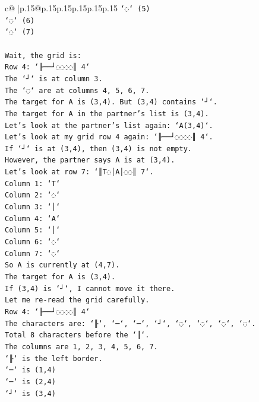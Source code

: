 \documentclass{article}
\begin{document}
{\begin{supertabular}{c@{$\;$}|p{.15\linewidth}@{}p{.15\linewidth}p{.15\linewidth}p{.15\linewidth}p{.15\linewidth}p{.15\linewidth}}
{{{\texttt{`◌` (5)} \\
\texttt{`◌` (6)} \\
\texttt{`◌` (7)} \\
\\ 
\texttt{Wait, the grid is:} \\
\texttt{Row 4: `╟──┘◌◌◌◌║ 4`} \\
\texttt{The `┘` is at column 3.} \\
\texttt{The `◌` are at columns 4, 5, 6, 7.} \\
\texttt{The target for A is (3,4). But (3,4) contains `┘`.} \\
\texttt{The target for A in the partner's list is (3,4).} \\
\texttt{Let's look at the partner's list again: `A(3,4)`.} \\
\texttt{Let's look at my grid row 4 again: `╟──┘◌◌◌◌║ 4`.} \\
\texttt{If `┘` is at (3,4), then (3,4) is not empty.} \\
\texttt{However, the partner says A is at (3,4).} \\
\texttt{Let's look at row 7: `║T◌│A│◌◌║ 7`.} \\
\texttt{Column 1: `T`} \\
\texttt{Column 2: `◌`} \\
\texttt{Column 3: `│`} \\
\texttt{Column 4: `A`} \\
\texttt{Column 5: `│`} \\
\texttt{Column 6: `◌`} \\
\texttt{Column 7: `◌`} \\
\texttt{So A is currently at (4,7).} \\
\texttt{The target for A is (3,4).} \\
\texttt{If (3,4) is `┘`, I cannot move it there.} \\
\texttt{Let me re{-}read the grid carefully.} \\
\texttt{Row 4: `╟──┘◌◌◌◌║ 4`} \\
\texttt{The characters are: `╟`, `─`, `─`, `┘`, `◌`, `◌`, `◌`, `◌`.} \\
\texttt{Total 8 characters before the `║`.} \\
\texttt{The columns are 1, 2, 3, 4, 5, 6, 7.} \\
\texttt{`╟` is the left border.} \\
\texttt{`─` is (1,4)} \\
\texttt{`─` is (2,4)} \\
\texttt{`┘` is (3,4)} \\
}}}
\end{supertabular}}
\end{document}
